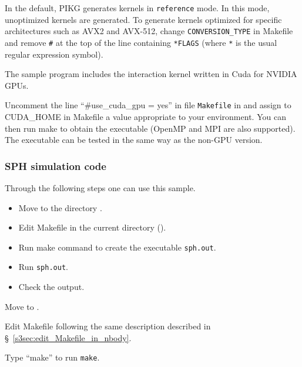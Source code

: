 In the default, PIKG generates kernels in \texttt{reference} mode. In this mode, unoptimized kernels are generated. To generate kernels optimized for specific architectures such as AVX2 and AVX-512, change \texttt{CONVERSION\_TYPE} in Makefile and remove \texttt{\#} at the top of the line containing \texttt{*FLAGS} (where \texttt{*} is the usual regular expression symbol). 

\ifCpp %
\label{sec:use_nvidia_gpu}

The sample program includes the interaction kernel written in Cuda for NVIDIA GPUs.

Uncomment the line ``\#use\_cuda\_gpu = yes'' in file \texttt{Makefile} in \dirNameNbodySample and assign to  CUDA\_HOME in Makefile  a value appropriate to your environment. You can then run  make to obtain the executable (OpenMP and MPI are also supported). The executable can be tested in the same way as the non-GPU version.
\endifCpp

\subsubsection{SPH simulation code}
Through the following steps one can use this sample.
\begin{itemize}
\item Move to the directory \dirNameSPHSample.
\item Edit Makefile in the current directory (\dirNameSPHSample).
\item Run make command to create the executable \texttt{sph.out}.
\item Run \texttt{sph.out}.
\item Check the output.
\end{itemize}

Move to \dirNameSPHSample.

Edit Makefile following the same description described in \S~\ref{s3sec:edit_Makefile_in_nbody}.

Type ``make'' to run \texttt{make}.

